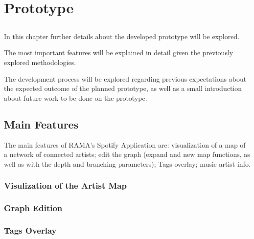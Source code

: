 
\chapter{Prototype}
\label{chap:chap4}

\section*{}

In this chapter further details about the developed prototype will be explored.

The most important features will be explained in detail given the previously explored methodologies.

The development process will be explored regarding previous expectations about the expected outcome of the planned prototype, as well as a small introduction about future work to be done on the prototype.




\section{Main Features} %
  \label{sec:main_features}
  
  The main features of RAMA's Spotify Application are: visualization of a map of a network of connected artists; edit the graph (expand and new map functions, as well as with the depth and branching parameters); Tags overlay; music artist info.

  \subsection{Visulization of the Artist Map} %
    \label{sub:visualization}
  



  \subsection{Graph Edition} %
    \label{sub:edition}
  


  \subsection{Tags Overlay} %
    \label{sub:tags_overlay}
  



